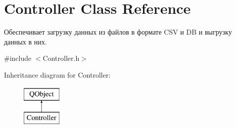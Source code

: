 \hypertarget{class_controller}{}\section{Controller Class Reference}
\label{class_controller}


Обеспечивает загрузку данных из файлов в формате C\+SV и DB и выгрузку данных в них.  




{\ttfamily \#include $<$Controller.\+h$>$}

Inheritance diagram for Controller\+:\begin{figure}[H]
\begin{center}
\leavevmode
\includegraphics[height=2.000000cm]{class_controller}
\end{center}
\end{figure}
